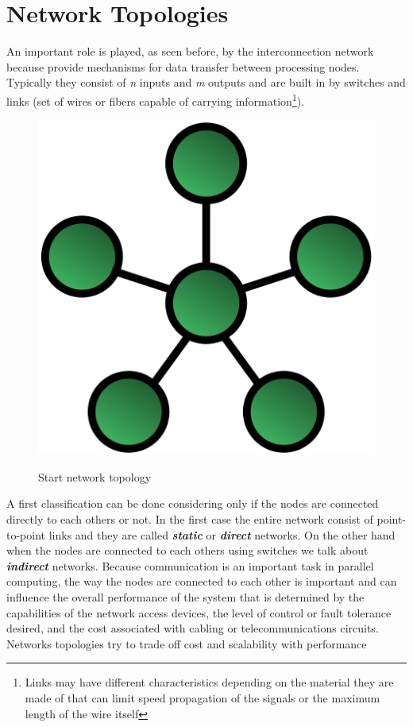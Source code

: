 \section{Network Topologies}
An important role is played, as seen before, by the interconnection network 
because provide mechanisms for data transfer between processing nodes.
Typically they consist of \textit{n} inputs and \textit{m} outputs and are built
in by switches and links (set of wires or fibers capable of carrying
information\footnote{Links may have different characteristics depending on
the material they are made of that can limit speed propagation of the signals
or the maximum length of the wire itself}).
\begin{figure}
\begin{center}
\caption{Start network topology}
\includegraphics[scale=0.30]{./images/StartMesh}
\label{fig:starMesh}
\end{center}
\end{figure}
A first classification can be done considering only if the nodes are connected
directly to each others or not. In the first case the entire network consist of
point-to-point links and they are called \textbf{\textit{static}} or
\textbf{\textit{direct}} networks. On the other hand when the nodes are
connected to each others using switches we talk about \textbf{\textit{indirect}}
networks. Because communication is an important task in parallel computing,
the way the nodes are connected to each other is important and can influence
the overall performance of the system that is determined by the capabilities of
the network access devices, the level of control or fault tolerance desired, and
the cost associated with cabling or telecommunications circuits.
Networks topologies try to trade off cost and scalability with performance

